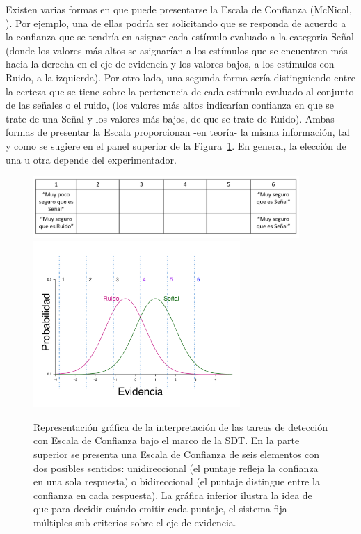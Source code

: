 \begin{itemize}
Existen varias formas en que puede presentarse la Escala de Confianza (McNicol, \citeyear{McNicol2}). Por ejemplo, una de ellas podría ser solicitando que se responda de acuerdo a la confianza que se tendría en asignar cada estímulo evaluado a la categoria Señal (donde los valores más altos se asignarían a los estímulos que se encuentren más hacia la derecha en el eje de evidencia y los valores bajos, a los estímulos con Ruido, a la izquierda). Por otro lado, una segunda forma sería distinguiendo entre la certeza que se tiene sobre la pertenencia de cada estímulo evaluado al conjunto de las señales o el ruido, (los valores más altos indicarían confianza en que se trate de una Señal y los valores más bajos, de que se trate de Ruido). Ambas formas de presentar la Escala proporcionan -en teoría- la misma información, tal y como se sugiere en el panel superior de la Figura~\ref{fig:Conf_Rat}. En general, la elección de una u otra depende del experimentador.\\

\begin{figure}[h]
\centering
\includegraphics[width=0.9\textwidth]{Figures/Puntajes_Criterios}\\
\includegraphics[width=0.70\textwidth]{Figures/ConfidenceRating}\\
\caption[Tareas de detección con Escala de Confianza y su interpretación]{Representación gráfica de la interpretación de las tareas de detección con Escala de Confianza bajo el marco de la SDT. En la parte superior se presenta una Escala de Confianza de seis elementos con dos posibles sentidos: unidireccional (el puntaje refleja la confianza en una sola respuesta) o bidireccional (el puntaje distingue entre la confianza en cada respuesta). La gráfica inferior ilustra la idea de que para decidir cuándo emitir cada puntaje, el sistema fija múltiples sub-criterios sobre el eje de evidencia.}
\label{fig:Conf_Rat}
\end{figure}


\end{itemize}
